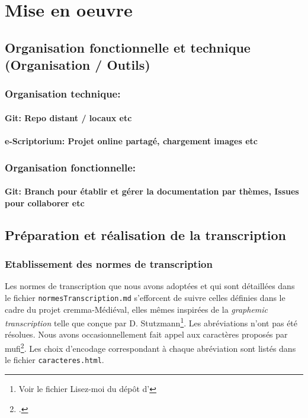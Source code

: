 \documentclass{article}
\begin{document}
	\section{Mise en oeuvre}
	
	\subsection{Organisation fonctionnelle et technique (Organisation / Outils)}
	
	\subsubsection{Organisation technique:}
	\paragraph{Git: Repo distant / locaux etc}
	\paragraph{e-Scriptorium: Projet online partagé, chargement images etc}
	
	\subsubsection{Organisation fonctionnelle:}
	\paragraph{Git: Branch pour établir et gérer la documentation par thèmes, Issues pour collaborer etc}
	
	\subsection{Préparation et réalisation de la transcription}
	\subsubsection{Etablissement des normes de transcription}
	Les normes de transcription que nous avons adoptées et qui sont détaillées dans le fichier \texttt{normesTranscription.md} s'efforcent de suivre celles définies dans le cadre du projet \gls{cremma}-Médiéval, elles mêmes inspirées de la \textit{graphemic transcription} telle que conçue par D. Stutzmann\footnote{Voir le fichier Lisez-moi du dépôt d'\cite{pincheCREMMAMedievalOld2021}}. Les abréviations n'ont pas été résolues. Nous avons occasionnellement fait appel aux caractères proposés par \gls{mufi}\footcite{MedievalUnicodeFont2016}. Les choix d'encodage correspondant à chaque abréviation sont listés dans le fichier \texttt{caracteres.html}.
	
\end{document}
